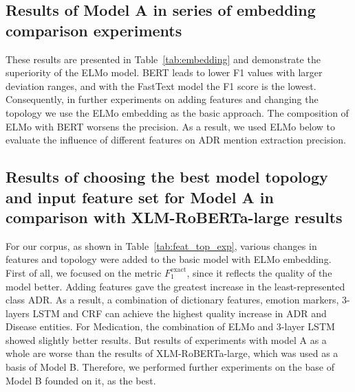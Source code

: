 \documentclass[a4paper,fleqn,longmktitle]{cas-dc}
\newcommand{\Fe}{F_1^\text{exact}}
\begin{document}
\subsection{Results of Model A in series of embedding comparison experiments} These results are presented in Table~\ref{tab:embedding} and demonstrate the superiority of the ELMo model. BERT leads to lower F1 values with larger deviation ranges, and with the FastText model the F1 score is the lowest. Consequently, in further experiments on adding features and changing the topology we use the ELMo embedding as the basic approach. 
The composition of ELMo with BERT worsens the precision. As a result, we used ELMo below to evaluate the influence of different features on ADR mention extraction precision.
    
\subsection{Results of choosing the best model topology and input feature set for Model A in comparison with XLM-RoBERTa-large results}
For our corpus, as shown in Table~\ref{tab:feat_top_exp}, various changes in features and topology were added to the basic model with ELMo embedding. First of all, we focused on the metric $\Fe$, since it reflects the quality of the model better. Adding features gave the greatest increase in the least-represented class ADR. As a result, a combination of dictionary features, emotion markers, 3-layers LSTM and CRF can achieve the highest quality increase in ADR and Disease entities. For Medication, the combination of ELMo and 3-layer LSTM showed slightly better results. But results of experiments with model A as a whole are worse than the results of XLM-RoBERTa-large, which was used as a basis of Model B. Therefore, we performed further experiments on the base of Model B founded on it, as the best.
\end{document}
